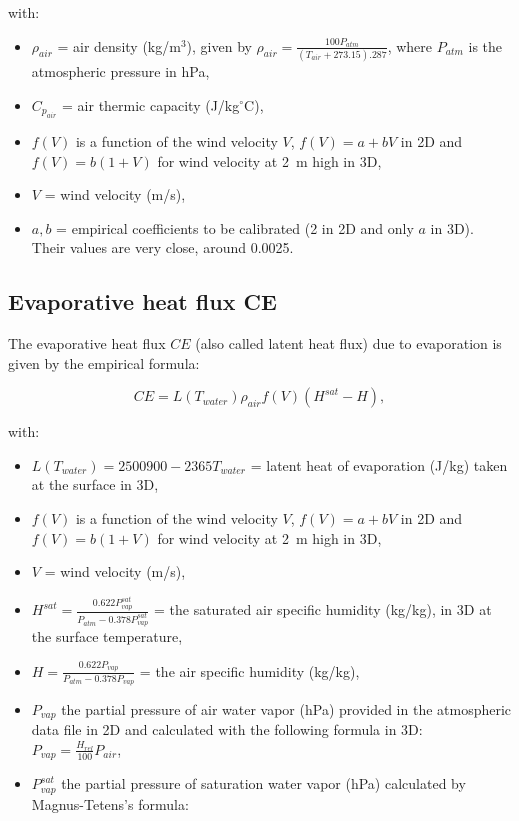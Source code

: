 with:
\begin{itemize}
  \item $\rho_{air}$ = air density (kg/m$^3$),
    given by $\rho_{air} = \frac{100 P_{atm}}{(T_{air} + 273.15).287}$,
    where $P_{atm}$ is the atmospheric pressure in hPa,
  \item $C_{p_{air}}$ = air thermic capacity (J/kg$^{\circ}$C),
  \item $f(V)$ is a function of the wind velocity $V$,
    $f(V) = a+bV$ in 2D and
    $f(V) = b(1+V)$ for wind velocity at 2~m high in 3D,
  \item $V$ = wind velocity (m/s),
  \item $a, b$ = empirical coefficients
    to be calibrated (2 in 2D and only $a$ in 3D).
    Their values are very close, around 0.0025.
\end{itemize}

\subsection{Evaporative heat flux CE}

The evaporative heat flux $CE$ (also called latent heat flux)
due to evaporation is given by the empirical formula:

\begin{equation}
  CE = L(T_{water}) \rho_{air} f(V) (H^{sat} - H),
\end{equation}

with:
\begin{itemize}
  \item $L(T_{water}) = 2500900 - 2365 T_{water}$ = latent heat of evaporation (J/kg)
    taken at the surface in 3D,
  \item $f(V)$ is a function of the wind velocity $V$,
    $f(V) = a+bV$ in 2D and
    $f(V) = b(1+V)$ for wind velocity at 2~m high in 3D,
  \item $V$ = wind velocity (m/s),
  \item $H^{sat} = \frac{0.622 P_{vap}^{sat}}{P_{atm}-0.378 P_{vap}^{sat}}$
    = the saturated air specific humidity (kg/kg),
    in 3D at the surface temperature,
  \item $H = \frac{0.622 P_{vap}}{P_{atm}-0.378 P_{vap}}$
    = the air specific humidity (kg/kg),
  \item $P_{vap}$ the partial pressure of air water vapor (hPa)
    provided in the atmospheric data file in 2D
    and calculated with the following formula in 3D:
    $P_{vap} = \frac{H_{rel}}{100} P_{air}$,
  \item  $P_{vap}^{sat}$ the partial pressure of saturation water vapor (hPa)
    calculated by Magnus-Tetens's formula:
\end{itemize}

